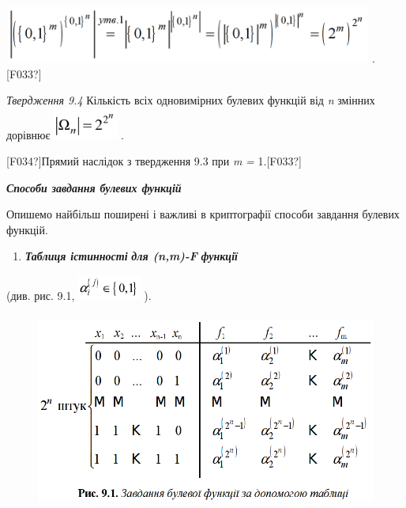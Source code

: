 {\centering
 \includegraphics[width=4.7756in,height=0.7402in]{crypt-img/crypt-img98.png}
.\textlatin{[F033?]}
\par}


\bigskip


\bigskip


\bigskip

\textit{Твердження 9.4}  Кількість  всіх одновимірних булевих функцій від
\textit{n }змінних дорівнює  
\includegraphics[width=0.8339in,height=0.4016in]{crypt-img/crypt-img99.png} .

\textlatin{[F034?]}Прямий наслідок з твердження 9.3 при  \textit{m}\textit{ =
}1.\textlatin{[F033?]}


\bigskip


\bigskip

{\centering\bfseries\itshape
Способи завдання булевих функцій
\par}


\bigskip

Опишемо найбільш поширені і важливі в криптографії способи завдання булевих
функцій.


\bigskip

\liststyleWWviiiNumlii
\begin{enumerate}
\item \textbf{\textit{Таблиця істинності}} \textbf{\textit{для 
(}}\textbf{\textit{n}}\textbf{\textit{,}}\textbf{\textit{m}}\textbf{\textit{)-}}\textbf{\textit{F}}\textbf{\textit{
 функції}}
\end{enumerate}
 (див. рис. 9.1, 
\includegraphics[width=0.8189in,height=0.3189in]{crypt-img/crypt-img100.png} ).


\bigskip



\begin{figure}
\centering
\includegraphics[width=5.0043in,height=2.5457in]{crypt-img/crypt-img101.png}
\end{figure}

